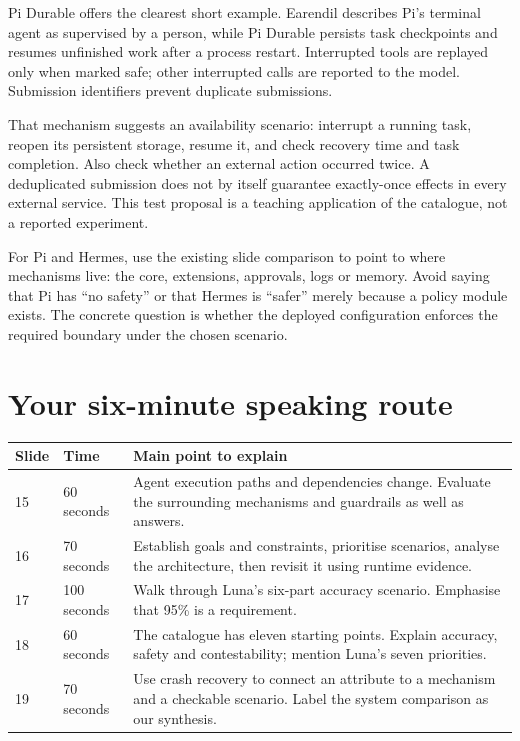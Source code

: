 \documentclass[11pt,a4paper]{article}
\begin{document}
Pi Durable offers the clearest short example. Earendil describes Pi's terminal agent as supervised by a person, while Pi Durable persists task checkpoints and resumes unfinished work after a process restart. Interrupted tools are replayed only when marked safe; other interrupted calls are reported to the model. Submission identifiers prevent duplicate submissions.\ \cite{durable}

That mechanism suggests an availability scenario: interrupt a running task, reopen its persistent storage, resume it, and check recovery time and task completion. Also check whether an external action occurred twice. A deduplicated submission does not by itself guarantee exactly-once effects in every external service. This test proposal is a teaching application of the catalogue, not a reported experiment.

For Pi and Hermes, use the existing slide comparison to point to where mechanisms live: the core, extensions, approvals, logs or memory. Avoid saying that Pi has ``no safety'' or that Hermes is ``safer'' merely because a policy module exists. The concrete question is whether the deployed configuration enforces the required boundary under the chosen scenario.

\section{Your six-minute speaking route}
\begin{tabularx}{\textwidth}{@{}p{}p{}Y@{}}
\toprule
\textbf{Slide} & \textbf{Time} & \textbf{Main point to explain}\\
 & 60 seconds & Agent execution paths and dependencies change. Evaluate the surrounding mechanisms and guardrails as well as answers.\\
16 & 70 seconds & Establish goals and constraints, prioritise scenarios, analyse the architecture, then revisit it using runtime evidence.\\
17 & 100 seconds & Walk through Luna's six-part accuracy scenario. Emphasise that 95\% is a requirement.\\
18 & 60 seconds & The catalogue has eleven starting points. Explain accuracy, safety and contestability; mention Luna's seven priorities.\\
19 & 70 seconds & Use crash recovery to connect an attribute to a mechanism and a checkable scenario. Label the system comparison as our synthesis.\\
\bottomrule
\end{tabularx}
\end{document}
